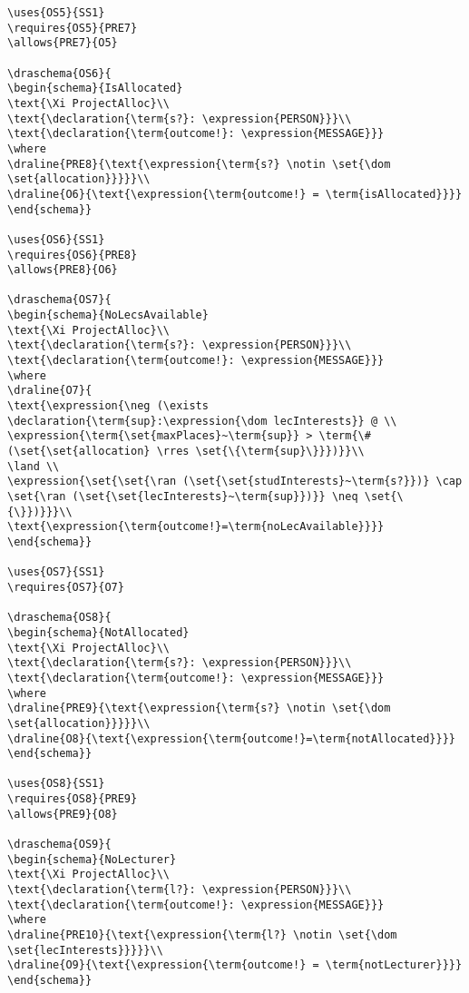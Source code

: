 \begin{verbatim}
\uses{OS5}{SS1}
\requires{OS5}{PRE7}
\allows{PRE7}{O5}

\draschema{OS6}{
\begin{schema}{IsAllocated}
\text{\Xi ProjectAlloc}\\
\text{\declaration{\term{s?}: \expression{PERSON}}}\\
\text{\declaration{\term{outcome!}: \expression{MESSAGE}}}
\where
\draline{PRE8}{\text{\expression{\term{s?} \notin \set{\dom \set{allocation}}}}}\\
\draline{O6}{\text{\expression{\term{outcome!} = \term{isAllocated}}}}
\end{schema}}

\uses{OS6}{SS1}
\requires{OS6}{PRE8}
\allows{PRE8}{O6}

\draschema{OS7}{
\begin{schema}{NoLecsAvailable}
\text{\Xi ProjectAlloc}\\
\text{\declaration{\term{s?}: \expression{PERSON}}}\\
\text{\declaration{\term{outcome!}: \expression{MESSAGE}}}
\where
\draline{O7}{
\text{\expression{\neg (\exists \declaration{\term{sup}:\expression{\dom lecInterests}} @ \\
\expression{\term{\set{maxPlaces}~\term{sup}} > \term{\# (\set{\set{allocation} \rres \set{\{\term{sup}\}}})}}\\
\land \\
\expression{\set{\set{\ran (\set{\set{studInterests}~\term{s?}})} \cap \set{\ran (\set{\set{lecInterests}~\term{sup}})}} \neq \set{\{\}})}}}\\
\text{\expression{\term{outcome!}=\term{noLecAvailable}}}}
\end{schema}}

\uses{OS7}{SS1}
\requires{OS7}{O7}

\draschema{OS8}{
\begin{schema}{NotAllocated}
\text{\Xi ProjectAlloc}\\
\text{\declaration{\term{s?}: \expression{PERSON}}}\\
\text{\declaration{\term{outcome!}: \expression{MESSAGE}}}
\where
\draline{PRE9}{\text{\expression{\term{s?} \notin \set{\dom \set{allocation}}}}}\\
\draline{O8}{\text{\expression{\term{outcome!}=\term{notAllocated}}}}
\end{schema}}

\uses{OS8}{SS1}
\requires{OS8}{PRE9}
\allows{PRE9}{O8}

\draschema{OS9}{
\begin{schema}{NoLecturer}
\text{\Xi ProjectAlloc}\\
\text{\declaration{\term{l?}: \expression{PERSON}}}\\
\text{\declaration{\term{outcome!}: \expression{MESSAGE}}}
\where
\draline{PRE10}{\text{\expression{\term{l?} \notin \set{\dom \set{lecInterests}}}}}\\
\draline{O9}{\text{\expression{\term{outcome!} = \term{notLecturer}}}}
\end{schema}}


\end{verbatim}
